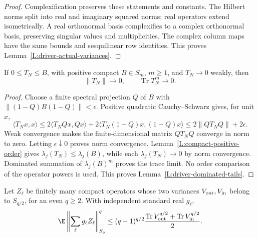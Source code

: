 \begin{proof}
  Complexification preserves these statements and constants. The Hilbert
  norms split into real and imaginary squared norms; real operators extend
  isometrically. A real orthonormal basis complexifies to a complex
  orthonormal basis, preserving singular values and multiplicities. The
  complex column maps have the same bounds and sesquilinear row identities.
  This proves Lemma~\ref{L:driver-actual-variances}.
\end{proof}

\begin{lemma}\label{L:driver-dominated-tails}
  If $0\le T_N\le B$, with positive compact $B\in S_m$, $m\ge1$, and
  $T_N\to0$ weakly, then
  \begin{equation}\label{E:driver-trace-tails}
    \|T_N\|\longrightarrow0,\qquad \operatorname{Tr}T_N^m\longrightarrow0.
  \end{equation}
\end{lemma}

\begin{proof}
  Choose a finite spectral projection $Q$ of $B$ with
  $\|(1-Q)B(1-Q)\|<\epsilon$. Positive quadratic Cauchy--Schwarz gives,
  for unit $x$,
  \[
    \langle T_Nx,x\rangle
    \le2\langle T_NQx,Qx\rangle
    +2\langle T_N(1-Q)x,(1-Q)x\rangle
    \le2\|QT_NQ\|+2\epsilon.
  \]
  Weak convergence makes the finite-dimensional matrix $QT_NQ$ converge
  in norm to zero. Letting $\epsilon\downarrow0$ proves norm convergence.
  Lemma~\ref{L:compact-positive-order} gives
  $\lambda_j(T_N)\le\lambda_j(B)$, while each $\lambda_j(T_N)\to0$ by
  norm convergence. Dominated summation of $\lambda_j(B)^m$ proves the
  trace limit. No order comparison of the operator powers is used.
  This proves Lemma~\ref{L:driver-dominated-tails}.
\end{proof}

\begin{lemma}\label{L:driver-gaussian-tail-average}
  Let $Z_\ell$ be finitely many compact operators whose two variances
  $V_{\rm out},V_{\rm in}$ belong to $S_{q/2}$, for an even $q\ge2$.
  With independent standard real $g_\ell$,
  \begin{equation}\label{E:driver-retained-gaussian-average}
    \E\left\|\sum_\ell g_\ell Z_\ell\right\|_{S_q}^q
    \le(q-1)^{q/2}\frac{\operatorname{Tr}V_{\rm out}^{q/2}
    +\operatorname{Tr}V_{\rm in}^{q/2}}2.
  \end{equation}
\end{lemma}

